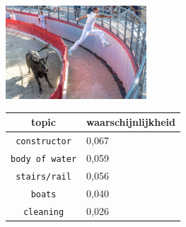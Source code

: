 \begin{figure}
\begin{subfigure}{\textwidth}
    \centering
    \begin{minipage}[t][3.5cm]{.5\linewidth}
    \centering
    \vspace{0pt}
    \includegraphics[height=3.5cm]{Images/LDA/7446693604.jpg}
    \end{minipage}\hfill
    \begin{minipage}[t]{.5\textwidth}
    \centering
    \vspace{0pt}
    \begin{tabular}{cl}
            topic                           & waarschijnlijkheid\\
            \hline
            \texttt{constructor}             & 0,067 \\
            \texttt{body of water}                   & 0,059 \\
            \texttt{stairs/rail}                 & 0,056 \\
            \texttt{boats}           & 0,040 \\
            \texttt{cleaning}        & 0,026\\
            \hline
        \end{tabular}
    \end{minipage}
\end{subfigure}

\vspace*{4mm}


\end{figure}
